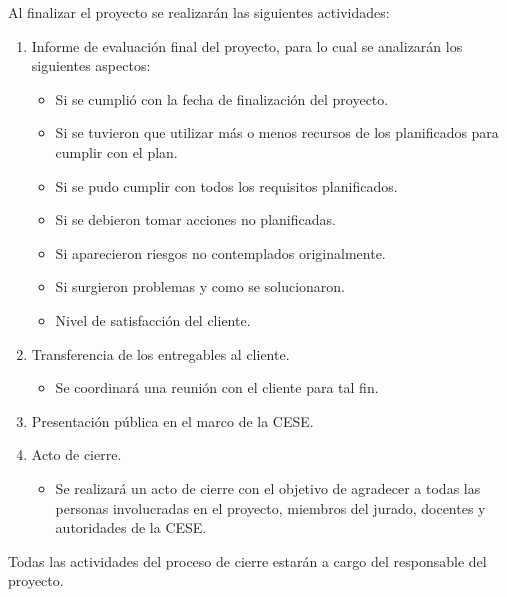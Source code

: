 \documentclass[
11pt, %
codirector, %
]{charter}
\begin{document}
Al finalizar el proyecto se realizarán las siguientes actividades:
\begin{enumerate}
	\item Informe de evaluación final del proyecto, para lo cual se analizarán los siguientes aspectos:
		\begin{itemize}
			\item Si se cumplió con la fecha de finalización del proyecto.
			\item Si se tuvieron que utilizar más o menos recursos de los planificados para cumplir con el plan.
			\item Si se pudo cumplir con todos los requisitos planificados.
			\item Si se debieron tomar acciones no planificadas.
			\item Si aparecieron riesgos no contemplados originalmente.
			\item Si surgieron problemas y como se solucionaron.
			\item Nivel de satisfacción del cliente.
		\end{itemize}
	\item Transferencia de los entregables al cliente.
		\begin{itemize}
			\item Se coordinará una reunión con el cliente para tal fin.
		\end{itemize}
	\item Presentación pública en el marco de la CESE.

	\item Acto de cierre.
		\begin{itemize}
			\item Se realizará un acto de cierre con el objetivo de agradecer a todas las personas involucradas en el proyecto, miembros del jurado, docentes y autoridades de la CESE.
		\end{itemize}

\end{enumerate}


Todas las actividades del proceso de cierre estarán a cargo del responsable del proyecto.
\end{document}
